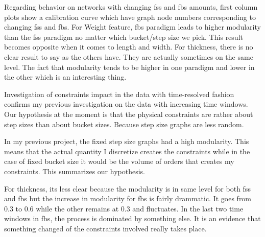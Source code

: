 {\color{red}
	Regarding behavior on networks with changing fss and fbs amounts, first column plots show a calibration curve which have graph node numbers corresponding to changing fss and fbs. For Weight feature, fbs paradigm leads to higher modularity than the fss paradigm no matter which bucket/step size we pick. This result becomes opposite when it comes to length and width. For thickness, there is no clear result to say as the others have. They are actually sometimes on the same level. The fact that modularity tends to be higher in one paradigm and lower in the other which is an interesting thing.
	
	Investigation of constraints impact in the data with time-resolved fashion confirms my previous investigation on the data with increasing time windows. 
	Our hypothesis at the moment is that the physical constraints are rather about step sizes than about bucket sizes. Because step size graphs are less random.
	
	In my previous project, the fixed step size graphs had a high modularity. This means that the actual quantity I discretize creates the constraints while in the case of fixed bucket size it would be the volume of orders that creates my constraints. This summarizes our hypothesis. 
	
	
	For thickness, its less clear because the modularity is in same level for both fss and fbs but the increase in modularity for fbs is fairly drammatic. It goes from 0.3 to 0.6 while the other remains at 0.3 and fluctuates. In the last two time windows in fbs, the process is dominated by something else. It is an evidence that something changed of the constraints involved really takes place.
	
	
	
}
